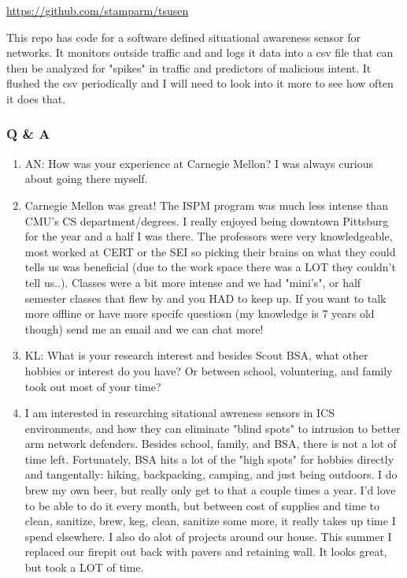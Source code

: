 \url{https://github.com/stamparm/tsusen} 

This repo has code for a software defined situational awareness sensor for networks. It monitors outside traffic and and logs it data into a csv file that can then be analyzed for "spikes" in traffic and predictors of malicious intent. It flushed the csv periodically and I will need to look into it more to see how often it does that.

\subsubsection{Q \& A}
    \begin{enumerate}
        \item AN: How was your experience at Carnegie Mellon? I was always curious about going there myself.

        \item Carnegie Mellon was great! The ISPM program was much less intense than CMU's CS department/degrees. I really enjoyed being downtown Pittsburg for the year and a half I was there. The professors were very knowledgeable, most worked at CERT or the SEI so picking their brains on what they could tells us was beneficial (due to the work space there was a LOT they couldn't tell us..). Classes were a bit more intense and we had "mini's", or half semester classes that flew by and you HAD to keep up. If you want to talk more offline or have more specifc questiosn (my knowledge is 7 years old though) send me an email and we can chat more!
        
        \item KL: What is your research interest and besides Scout BSA, what other hobbies or interest do you have? Or between school, voluntering, and family took out most of your time?
        
        \item I am interested in researching sitational awreness sensors in ICS environments, and how they can eliminate "blind spots" to intrusion to better arm network defenders. Besides school, family, and BSA, there is not a lot of time left. Fortunately, BSA hits a lot of the "high spots" for hobbies directly and tangentally: hiking, backpacking, camping, and just being outdoors. I do brew my own beer, but really only get to that a couple times a year. I'd love to be able to do it every month, but between cost of supplies and time to clean, sanitize, brew, keg, clean, sanitize some more, it really takes up time I spend elsewhere. I also do alot of projects around our house. This summer I replaced our firepit out back with pavers and retaining wall. It looks great, but took a LOT of time.
    
    \end{enumerate}

